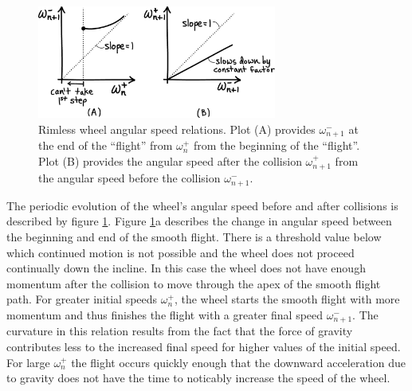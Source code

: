 \begin{figure}[h]		%
\begin{centering}
\includegraphics[width=0.7\textwidth]{Figures/RimlessPlots2}\par
\end{centering}
\caption[Plot: Rimless Wheel Angular Speed Relations]{Rimless wheel angular speed relations. Plot (A) provides $\omega_{n+1}^{-}$ at the end of the ``flight'' from $\omega_{n}^{+}$ from the beginning of the ``flight''. Plot (B) provides the angular speed after the collision $\omega_{n+1}^{+}$ from the angular speed before the collision $\omega_{n+1}^{-}$.}
\label{fig:RimlessPlots2}
\end{figure}
%

The periodic evolution of the wheel's angular speed before and after collisions
is described by figure \ref{fig:RimlessPlots2}. Figure \ref{fig:RimlessPlots2}a
describes the change in angular speed between the beginning and end of the
smooth flight. There is a threshold value below which continued motion is not
possible and the wheel does not proceed continually down the incline. In this
case the wheel does not have enough momentum after the collision to move
through the apex of the smooth flight path. For greater initial speeds
$\omega_{n}^{+}$, the wheel starts the smooth flight with more momentum and
thus finishes the flight with a greater final speed $\omega_{n+1}^{-}$. The
curvature in this relation results from the fact that the force of gravity
contributes less to the increased final speed for higher values of the initial
speed. For large $\omega_{n}^{+}$ the flight occurs quickly enough that the
downward acceleration due to gravity does not have the time to noticably
increase the speed of the wheel.

